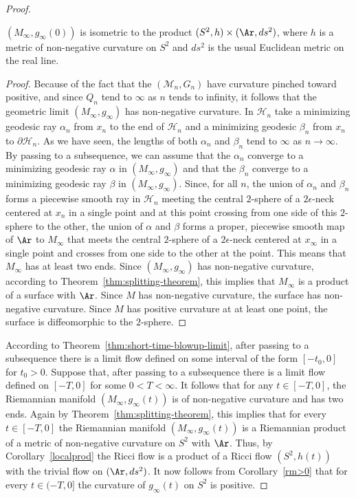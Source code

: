 \begin{proof}
\begin{claim}
\label{claim:limit-splits-as-cylinder}
$(M_\infty,g_\infty(0))$ is isometric to the product $(S^2,h)\times
(\Ar,ds^2)$, where $h$ is a metric of non-negative curvature on
$S^2$ and $ds^2$ is the usual Euclidean metric on the real line.
\end{claim}

\begin{proof}
Because of the fact that the $({\mathcal M}_n,G_n)$
have curvature pinched toward positive, and since $Q_n$ tend to
$\infty$ as $n$ tends to infinity, it follows that the geometric
limit $(M_\infty,g_\infty)$ has non-negative curvature. In
${\mathcal H}_n$ take a minimizing geodesic ray $\alpha_n$ from
$x_n$ to the end of ${\mathcal H}_n$ and a minimizing geodesic
$\beta_n$ from $x_n$ to $\partial {\mathcal H}_n$. As we have seen,
the lengths of both $\alpha_n$ and $\beta_n$ tend to $\infty$ as
$n\rightarrow \infty$. By passing to a subsequence, we can assume
that the $\alpha_n$ converge to a minimizing geodesic ray $\alpha$
in $(M_\infty,g_\infty)$ and that the $\beta_n$ converge to a
minimizing geodesic ray $\beta$ in $(M_\infty,g_\infty)$. Since, for
all $n$, the union of $\alpha_n$ and $\beta_n$ forms a piecewise
smooth ray in ${\mathcal H_n}$ meeting the central $2$-sphere of a
$2\epsilon$-neck centered at $x_n$ in a single point and at this
point crossing from one side of this $2$-sphere to the other, the
union of $\alpha$ and $\beta$ forms a proper, piecewise smooth map
of $\Ar$ to $M_\infty$ that meets  the central $2$-sphere of a
$2\epsilon$-neck centered at $x_\infty$ in a single point and
crosses from one side to the other at the point. This means that
$M_\infty$ has at least two ends. Since $(M_\infty,g_\infty)$ has
non-negative curvature, according to Theorem~\ref{thm:splitting-theorem}, this
implies that $M_\infty$ is a product of a surface with $\Ar$. Since
$M$ has non-negative curvature, the surface has non-negative
curvature. Since $M$ has positive curvature at at least one point,
the surface is diffeomorphic to the $2$-sphere.
\end{proof}


According to Theorem~\ref{thm:short-time-blowup-limit}, after passing to a subsequence
there is a limit flow defined on some interval of the form
$[-t_0,0]$ for $t_0>0$. Suppose that, after passing to a subsequence
there is a limit flow defined on $[-T,0]$ for some $0<T<\infty$. It
follows that for any $t\in [-T,0]$, the Riemannian manifold
$(M_\infty,g_\infty(t))$ is of non-negative curvature and has two
ends. Again by Theorem~\ref{thm:splitting-theorem}, this implies that for every
$t\in [-T,0]$ the Riemannian manifold $(M_\infty,g_\infty(t))$ is a
Riemannian product of a metric of non-negative curvature on $S^2$
with $\Ar$. Thus, by Corollary~\ref{localprod} the Ricci flow is a
product of a Ricci flow  $(S^2,h(t))$ with the trivial flow on
$(\Ar,ds^2)$. It now follows from Corollary~\ref{rm>0} that for
every $t\in (-T,0]$ the curvature of $g_\infty(t)$ on $S^2$ is
positive.



\end{proof}
